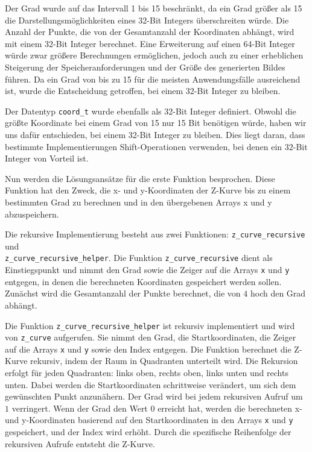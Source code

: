 \documentclass[course=erap]{aspdoc}
\begin{document}
\noindent Der Grad wurde auf das Intervall 1 bis 15 beschränkt, da ein Grad größer als 15 die Darstellungsmöglichkeiten eines 32-Bit Integers überschreiten würde. Die Anzahl der Punkte, die von der Gesamtanzahl der Koordinaten abhängt, wird mit einem 32-Bit Integer berechnet. Eine Erweiterung auf einen 64-Bit Integer würde zwar größere Berechnungen ermöglichen, jedoch auch zu einer erheblichen Steigerung der Speicheranforderungen und der Größe des generierten Bildes führen. Da ein Grad von bis zu 15 für die meisten Anwendungsfälle ausreichend ist, wurde die Entscheidung getroffen, bei einem 32-Bit Integer zu bleiben.
\setlength{\parskip}{1em}

\noindent Der Datentyp \texttt{coord\_t} wurde ebenfalls als 32-Bit Integer definiert. Obwohl die größte Koordinate bei einem Grad von 15 nur 15 Bit benötigen würde, haben wir uns dafür entschieden, bei einem 32-Bit Integer zu bleiben. Dies liegt daran, dass bestimmte Implementierungen Shift-Operationen verwenden, bei denen ein 32-Bit Integer von Vorteil ist.
\setlength{\parskip}{1em}

\noindent Nun werden die Lösungsansätze für die erste Funktion besprochen. Diese Funktion hat den Zweck, die x- und y-Koordinaten der Z-Kurve bis zu einem bestimmten Grad zu berechnen und in den übergebenen Arrays x und y abzuspeichern.
\setlength{\parskip}{1em}

\noindent Die rekursive Implementierung besteht aus zwei Funktionen: \texttt{z\_curve\_recursive} und\\  \texttt{z\_curve\_recursive\_helper}. Die Funktion \texttt{z\_curve\_recursive} dient als Einstiegspunkt und nimmt den Grad sowie die Zeiger auf die Arrays \texttt{x} und \texttt{y} entgegen, in denen die berechneten Koordinaten gespeichert werden sollen. Zunächst wird die Gesamtanzahl der Punkte berechnet, die von $4$ hoch den Grad abhängt.
\setlength{\parskip}{1em}

\noindent Die Funktion \texttt{z\_curve\_recursive\_helper} ist rekursiv implementiert und wird von \texttt{z\_curve} aufgerufen. Sie nimmt den Grad, die Startkoordinaten, die Zeiger auf die Arrays \texttt{x} und \texttt{y} sowie den Index entgegen. Die Funktion berechnet die Z-Kurve rekursiv, indem der Raum in Quadranten unterteilt wird. Die Rekursion erfolgt für jeden Quadranten: links oben, rechts oben, links unten und rechts unten. Dabei werden die Startkoordinaten schrittweise verändert, um sich dem gewünschten Punkt anzunähern. Der Grad wird bei jedem rekursiven Aufruf um $1$ verringert. Wenn der Grad den Wert $0$ erreicht hat, werden die berechneten x- und y-Koordinaten basierend auf den Startkoordinaten in den Arrays \texttt{x} und \texttt{y} gespeichert, und der Index wird erhöht. Durch die spezifische Reihenfolge der rekursiven Aufrufe entsteht die Z-Kurve.
\setlength{\parskip}{1em}
\end{document}
